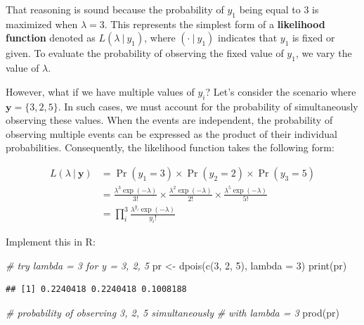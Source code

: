 \documentclass[
]{article}
\newenvironment{Shaded}{\begin{snugshade}}{\end{snugshade}}
\newcommand{\AttributeTok}[1]{\textcolor[rgb]{0.77,0.63,0.00}{#1}}
\newcommand{\CommentTok}[1]{\textcolor[rgb]{0.56,0.35,0.01}{\textit{#1}}}
\newcommand{\DecValTok}[1]{\textcolor[rgb]{0.00,0.00,0.81}{#1}}
\newcommand{\FunctionTok}[1]{\textcolor[rgb]{0.00,0.00,0.00}{#1}}
\newcommand{\NormalTok}[1]{#1}
\newcommand{\OtherTok}[1]{\textcolor[rgb]{0.56,0.35,0.01}{#1}}
\begin{document}
That reasoning is sound because the probability of \(y_1\) being equal to \(3\) is maximized when \(\lambda = 3\). This represents the simplest form of a \textbf{likelihood function} denoted as \(L(\lambda~|~y_1)\), where \((\cdot~|~y_1)\) indicates that \(y_1\) is fixed or given. To evaluate the probability of observing the fixed value of \(y_1\), we vary the value of \(\lambda\).

However, what if we have multiple values of \(y_i\)? Let's consider the scenario where \(\pmb{y} = \{3, 2, 5\}\). In such cases, we must account for the probability of simultaneously observing these values. When the events are independent, the probability of observing multiple events can be expressed as the product of their individual probabilities. Consequently, the likelihood function takes the following form:

\[
\begin{aligned}
L(\lambda~|~\pmb{y}) &= \Pr(y_1 = 3) \times \Pr(y_2 = 2) \times \Pr(y_3 = 5)\\
&= \frac{\lambda^{3}\exp(-\lambda)}{3!} \times \frac{\lambda^{2}\exp(-\lambda)}{2!} \times \frac{\lambda^{5}\exp(-\lambda)}{5!}\\
&= \prod_i^3 \frac{\lambda^{y_i} \exp(-\lambda)}{y_i!}
\end{aligned}
\]

Implement this in R:

\begin{Shaded}
\begin{Highlighting}[]
\CommentTok{\# try lambda = 3 for y = 3, 2, 5}
\NormalTok{pr }\OtherTok{\textless{}{-}} \FunctionTok{dpois}\NormalTok{(}\FunctionTok{c}\NormalTok{(}\DecValTok{3}\NormalTok{, }\DecValTok{2}\NormalTok{, }\DecValTok{5}\NormalTok{), }\AttributeTok{lambda =} \DecValTok{3}\NormalTok{)}
\FunctionTok{print}\NormalTok{(pr)}
\end{Highlighting}
\end{Shaded}

\begin{verbatim}
## [1] 0.2240418 0.2240418 0.1008188
\end{verbatim}

\begin{Shaded}
\begin{Highlighting}[]
\CommentTok{\# probability of observing 3, 2, 5 simultaneously}
\CommentTok{\# with lambda = 3}
\FunctionTok{prod}\NormalTok{(pr)}
\end{Highlighting}
\end{Shaded}
\end{document}
